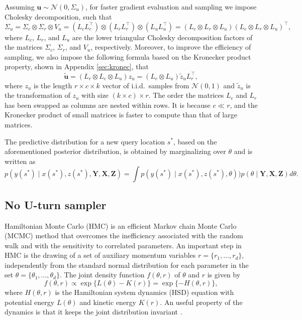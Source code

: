 \documentclass[a4paper]{article}   	%
\newcommand{\iid}{\textrm{i.i.d.\ }}
\newcommand{\N}{\mathcal{N}}
\begin{document}
	Assuming $\bm{u}\sim \N(0,\Sigma_u)$, for faster gradient evaluation and sampling we impose Cholesky decomposition, such that 
	\begin{equation}\label{eq:sigmau}
		\Sigma_u = \Sigma_c\otimes \Sigma_r\otimes V_u = (L_c L_c^\top)\otimes  (L_r L_r^\top)\otimes (L_u L_u^\top) = (L_c\otimes L_r\otimes L_u) (L_c\otimes L_r\otimes L_u)^\top, 
	\end{equation}
    where $L_c$, $L_r$, and $L_u$ are the lower triangular Cholesky decomposition factors of the matrices $\Sigma_c$, $\Sigma_r$, and $V_u$, respectively. 
	Moreover, to improve the efficiency of sampling, we also impose the following formula based on the Kronecker product property, shown in Appendix \ref{sec:kronec}, that 
	\begin{equation}
		\tilde{\bm{u}} = (L_r\otimes L_c\otimes L_u)z_u = (L_c\otimes L_u)\tilde{z}_u L_r^\top,
	\end{equation}
	where $z_u$ is the length $r\times c\times k$ vector of \iid samples from $\N(0,1)$ and  $\tilde{z}_u$ is the transformation of $z_u$ with size $(k\times c)\times r$. The order the matrices $L_c$ and $L_r$ has been swapped as columns are nested within rows. It is because $c\ll r$, and the Kronecker product of small matrices is faster to compute than that of large matrices. 
	
	The predictive distribution for a new query location $s^*$, based on the aforementioned posterior distribution, is obtained by marginalizing over $\theta$ and is written as 
	\begin{equation}\label{eq:prediction}
		p(y(s^*) \mid x(s^*), z(s^*), \bm{Y},\bm{X},\bm{Z}) = \int p(y(s^*) \mid x(s^*), z(s^*), \theta)) p(\theta\mid \bm{Y},\bm{X},\bm{Z}) d\theta. 
	\end{equation}
	
	
	\subsection{No U-turn sampler}
	
	Hamiltonian Monte Carlo (HMC) \parencite{Brooks2011Handbook,duane1987hybrid} is an efficient Markov chain Monte Carlo (MCMC) method that overcomes the inefficiency associated with the random walk and with the sensitivity to correlated parameters. An important step in HMC is the drawing of a set of auxiliary momentum variables $r=\lbrace r_1,\ldots,r_d\rbrace$, independently from the standard normal distribution for each parameter in the set $\theta=\lbrace\theta_1,\ldots,\theta_d\rbrace$. The joint density function $f(\theta,r)$ of $\theta$ and $r$ is given by
	\begin{equation}
		f(\theta,r) \propto \exp \lbrace L(\theta)-K(r) \rbrace = \exp \lbrace -H(\theta,r) \rbrace,
	\end{equation}
	where $H(\theta,r)$ is the Hamiltonian system dynamics (HSD) equation with potential energy $L(\theta)$ and kinetic energy $K(r)$. An useful property of the dynamics is that it keeps the joint distribution invariant \parencite{Nishio2019Performance}. 
	
\end{document}
